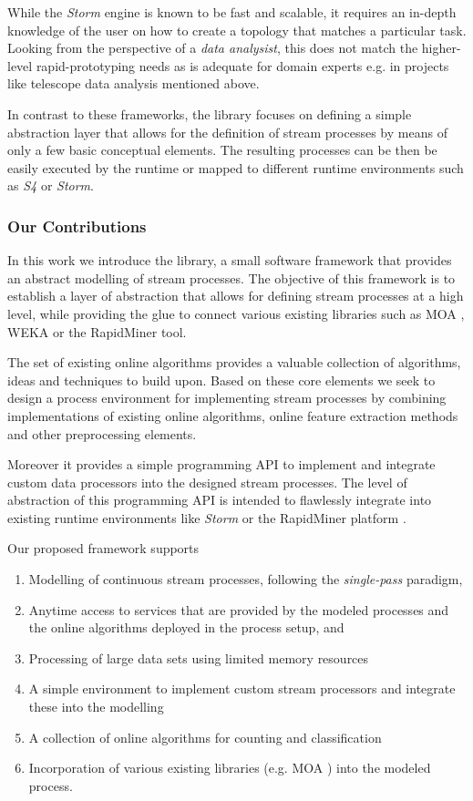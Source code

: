 While the {\em Storm} engine is known to be fast and scalable, it
requires an in-depth knowledge of the user on how to create a topology
that matches a particular task. Looking from the perspective of a {\em
  data analysist}, this does not match the higher-level
rapid-prototyping needs as is adequate for domain experts e.g. in
projects like telescope data analysis mentioned above.



In contrast to these frameworks, the \streams library focuses on
defining a simple abstraction layer that allows for the definition of
stream processes by means of only a few basic conceptual elements.
The resulting processes can be then be easily executed by the \streams
runtime or mapped to different runtime environments such as {\em S4}
or {\em Storm}.

\subsubsection*{Our Contributions}
In this work we introduce the \streams library, a small software
framework that provides an abstract modelling of stream processes. The
objective of this framework is to establish a layer of abstraction
that allows for defining stream processes at a high level, while
providing the glue to connect various existing libraries such as MOA
\cite{moa}, WEKA \cite{weka} or the RapidMiner tool.

The set of existing online algorithms provides a valuable collection
of algorithms, ideas and techniques to build upon. Based on these core
elements we seek to design a process environment for implementing
stream processes by combining implementations of existing online
algorithms, online feature extraction methods and other preprocessing
elements.

Moreover it provides a simple programming API to implement and
integrate custom data processors into the designed stream processes.
The level of abstraction of this programming API is intended to
flawlessly integrate into existing runtime environments like {\em
  Storm} or the RapidMiner platform \cite{rapidminerStreams}.

Our proposed framework supports
\begin{enumerate}
\item Modelling of continuous stream processes, following the {\em
    single-pass} paradigm,
\item Anytime access to services that are provided by the modeled
  processes and the online algorithms deployed in the process setup,
  and
\item Processing of large data sets using limited memory resources
\item A simple environment to implement custom stream processors and
  integrate these into the modelling
\item A collection of online algorithms for counting and classification
\item Incorporation of various existing libraries (e.g. MOA
  \cite{moa}) into the modeled process.
\end{enumerate}

